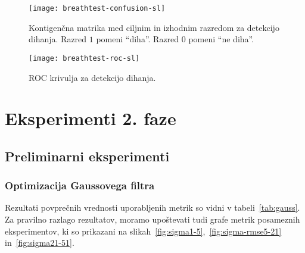 \begin{figure}[!htbp]
	\centering
	\texttt{[image: breathtest-confusion-sl]}
	\caption[Kontigenčna matrika za detekcijo dihanja]{Kontigenčna matrika med ciljnim in izhodnim razredom za detekcijo dihanja. Razred $1$ pomeni ``diha''. Razred $0$ pomeni ``ne diha''.}
	\label{fig:breathtest-confusion}
\end{figure}

\begin{figure}[!htbp]
	\centering
	\texttt{[image: breathtest-roc-sl]}
	\caption[ROC krivulja za detekcijo dihanja]{ROC krivulja za detekcijo dihanja.}
	\label{fig:breathtest-roc}
\end{figure}




























\section{Eksperimenti 2. faze}
\subsection{Preliminarni eksperimenti}











\subsubsection{Optimizacija Gaussovega filtra}
Rezultati povprečnih vrednosti uporabljenih metrik so vidni v tabeli~\ref{tab:gauss}. Za pravilno razlago rezultatov, moramo upoštevati tudi grafe metrik posameznih eksperimentov, ki so prikazani na slikah~\ref{fig:sigma1-5},~\ref{fig:sigma-rmse5-21} in~\ref{fig:sigma21-51}. 



